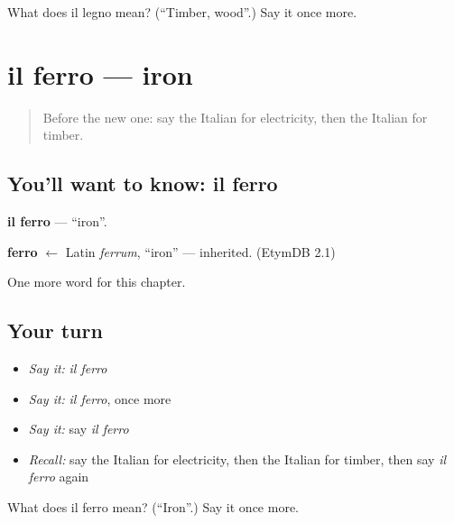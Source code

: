 \begin{tcolorbox}[breakable,colback=teal!4,colframe=teal!35!black,title={Before you move on}]
What does il legno mean? (\textquotedblleft{}Timber, wood\textquotedblright{}.) Say it once more.
\end{tcolorbox}
\section[il ferro]{il ferro — iron}

\label{lesson:IT-C201-ferro}



\begin{quote}
Before the new one: say the Italian for electricity, then the Italian for timber.
\end{quote}

\subsection*{You'll want to know: il ferro}
\textbf{il ferro} — \textquotedblleft{}iron\textquotedblright{}.

\begin{cousinweb}
\textbf{ferro} $\leftarrow$ Latin \emph{ferrum}, \textquotedblleft{}iron\textquotedblright{} — inherited. (EtymDB 2.1)
\end{cousinweb}

\begin{grammarlens}[title={What you've built}]
One more word for this chapter.
\end{grammarlens}

\subsection*{Your turn}
\begin{itemize}
\raggedright
  \item \emph{Say it:} \emph{il ferro}
  \item \emph{Say it:} \emph{il ferro}, once more
  \item \emph{Say it:} say \emph{il ferro}
  \item \emph{Recall:} say the Italian for electricity, then the Italian for timber, then say \emph{il ferro} again
\end{itemize}

\begin{tcolorbox}[breakable,colback=teal!4,colframe=teal!35!black,title={Before you move on}]
What does il ferro mean? (\textquotedblleft{}Iron\textquotedblright{}.) Say it once more.
\end{tcolorbox}
